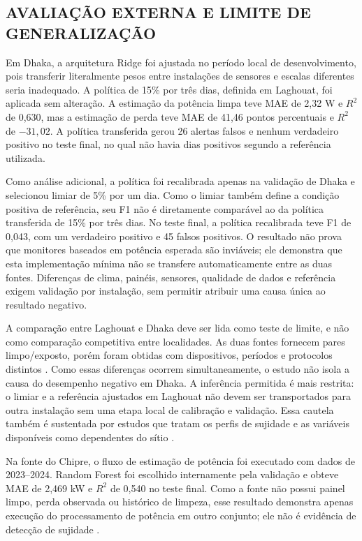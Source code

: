 \documentclass{UNESC}
\begin{document}
\subsection{AVALIAÇÃO EXTERNA E LIMITE DE GENERALIZAÇÃO}

Em Dhaka, a arquitetura Ridge foi ajustada no período local de desenvolvimento, pois transferir literalmente pesos entre instalações de sensores e escalas diferentes seria inadequado. A política de 15\% por três dias, definida em Laghouat, foi aplicada sem alteração. A estimação da potência limpa teve MAE de 2,32 W e $R^2$ de 0,630, mas a estimação de perda teve MAE de 41,46 pontos percentuais e $R^2$ de $-31,02$. A política transferida gerou 26 alertas falsos e nenhum verdadeiro positivo no teste final, no qual não havia dias positivos segundo a referência utilizada.

Como análise adicional, a política foi recalibrada apenas na validação de Dhaka e selecionou limiar de 5\% por um dia. Como o limiar também define a condição positiva de referência, seu F1 não é diretamente comparável ao da política transferida de 15\% por três dias. No teste final, a política recalibrada teve F1 de 0,043, com um verdadeiro positivo e 45 falsos positivos. O resultado não prova que monitores baseados em potência esperada são inviáveis; ele demonstra que esta implementação mínima não se transfere automaticamente entre as duas fontes. Diferenças de clima, painéis, sensores, qualidade de dados e referência exigem validação por instalação, sem permitir atribuir uma causa única ao resultado negativo.

A comparação entre Laghouat e Dhaka deve ser lida como teste de limite, e não como comparação competitiva entre localidades. As duas fontes fornecem pares limpo/exposto, porém foram obtidas com dispositivos, períodos e protocolos distintos \cite{seghir2026,akter2025}. Como essas diferenças ocorrem simultaneamente, o estudo não isola a causa do desempenho negativo em Dhaka. A inferência permitida é mais restrita: o limiar e a referência ajustados em Laghouat não devem ser transportados para outra instalação sem uma etapa local de calibração e validação. Essa cautela também é sustentada por estudos que tratam os perfis de sujidade e as variáveis disponíveis como dependentes do sítio \cite{muller2020profiles,tsanakas2025}.

Na fonte do Chipre, o fluxo de estimação de potência foi executado com dados de 2023--2024. Random Forest foi escolhido internamente pela validação e obteve MAE de 2,469 kW e $R^2$ de 0,540 no teste final. Como a fonte não possui painel limpo, perda observada ou histórico de limpeza, esse resultado demonstra apenas execução do processamento de potência em outro conjunto; ele não é evidência de detecção de sujidade \cite{symeonides2024}.
\end{document}
